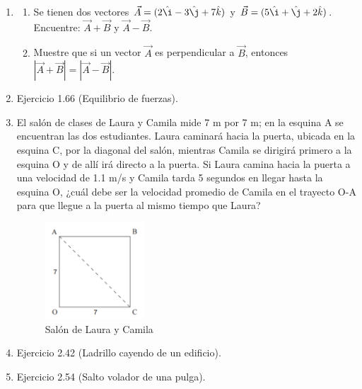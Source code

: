 \documentclass[letterpaper,10pt,onecolumn]{article}
\begin{document}
\begin{enumerate}

\item
\begin{enumerate}
\item Se tienen dos vectores $\vec{A}=(2\hat{\i}-3\hat{\j}+7\hat{k})$ y $\vec{B}=(5\hat{\i}+\hat{\j}+2\hat{k})$. Encuentre: $\vec{A}+\vec{B}$ y $\vec{A}-\vec{B}$. 
\item Muestre que si un vector $\vec{A}$ es perpendicular a $\vec{B}$, entonces $|\vec{A}+\vec{B}|=|\vec{A}-\vec{B}|$. 
\end{enumerate} %

\item Ejercicio 1.66 (Equilibrio de fuerzas). %

\item El salón de clases de Laura y Camila mide 7 m por 7 m; en la esquina A se encuentran las dos estudiantes. Laura caminará hacia la puerta, ubicada en la esquina C, por la diagonal del salón, mientras Camila se dirigirá primero a la esquina O y de allí irá directo a la puerta. Si Laura camina hacia la puerta a una velocidad de 1.1 m/s y Camila tarda 5 segundos en llegar hasta la esquina O, ¿cuál debe ser la velocidad promedio de Camila en el trayecto O-A para que llegue a la puerta al mismo tiempo que Laura?
\begin{figure}[h]
  \centering
  \includegraphics[width=0.35\textwidth]{salon}
  \caption{Salón de Laura y Camila} \label{f:salon}
\end{figure} %

\item Ejercicio 2.42 (Ladrillo cayendo de un edificio). %
\item Ejercicio 2.54 (Salto volador de una pulga). %


\end{enumerate}
\end{document}
